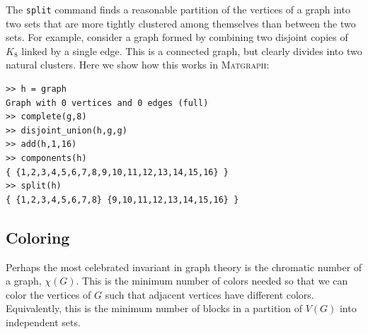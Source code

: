 \documentclass[12pt]{amsart}
\newcommand\matgraph{\textsc{Matgraph}}
\begin{document}
The \verb|split| command finds a reasonable partition of the vertices
of a graph into two sets that are more tightly clustered among
themselves than between the two sets. For example, consider a graph
formed by combining two disjoint copies of $K_8$ linked by a single
edge. This is a connected graph, but clearly divides into two natural
clusters. Here we show how this works in \matgraph:
\begin{verbatim}
>> h = graph
Graph with 0 vertices and 0 edges (full)
>> complete(g,8)
>> disjoint_union(h,g,g)
>> add(h,1,16)
>> components(h)
{ {1,2,3,4,5,6,7,8,9,10,11,12,13,14,15,16} }
>> split(h)
{ {1,2,3,4,5,6,7,8} {9,10,11,12,13,14,15,16} }
\end{verbatim}


\subsection{Coloring}
Perhaps the most celebrated invariant in graph theory is the chromatic
number of a graph, $\chi(G)$. This is the minimum number of colors
needed so that we can color the vertices of $G$ such that adjacent
vertices have different colors. Equivalently, this is the minimum
number of blocks in a partition of $V(G)$ into independent sets.
\end{document}
